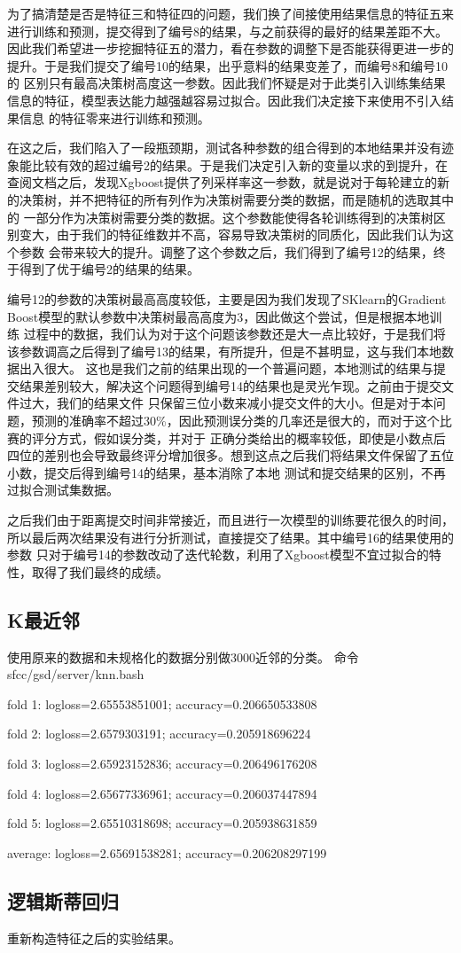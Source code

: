 为了搞清楚是否是特征三和特征四的问题，我们换了间接使用结果信息的特征五来进行训练和预测，提交得到了编号8的结果，与之前获得的最好的结果差距不大。
因此我们希望进一步挖掘特征五的潜力，看在参数的调整下是否能获得更进一步的提升。于是我们提交了编号10的结果，出乎意料的结果变差了，而编号8和编号10的
区别只有最高决策树高度这一参数。因此我们怀疑是对于此类引入训练集结果信息的特征，模型表达能力越强越容易过拟合。因此我们决定接下来使用不引入结果信息
的特征零来进行训练和预测。

在这之后，我们陷入了一段瓶颈期，测试各种参数的组合得到的本地结果并没有迹象能比较有效的超过编号2的结果。于是我们决定引入新的变量以求的到提升，在
查阅文档之后，发现Xgboost提供了列采样率这一参数，就是说对于每轮建立的新的决策树，并不把特征的所有列作为决策树需要分类的数据，而是随机的选取其中的
一部分作为决策树需要分类的数据。这个参数能使得各轮训练得到的决策树区别变大，由于我们的特征维数并不高，容易导致决策树的同质化，因此我们认为这个参数
会带来较大的提升。调整了这个参数之后，我们得到了编号12的结果，终于得到了优于编号2的结果的结果。

编号12的参数的决策树最高高度较低，主要是因为我们发现了SKlearn的Gradient Boost模型的默认参数中决策树最高高度为3，因此做这个尝试，但是根据本地训练
过程中的数据，我们认为对于这个问题该参数还是大一点比较好，于是我们将该参数调高之后得到了编号13的结果，有所提升，但是不甚明显，这与我们本地数据出入很大。
这也是我们之前的结果出现的一个普遍问题，本地测试的结果与提交结果差别较大，解决这个问题得到编号14的结果也是灵光乍现。之前由于提交文件过大，我们的结果文件
只保留三位小数来减小提交文件的大小。但是对于本问题，预测的准确率不超过30\%，因此预测误分类的几率还是很大的，而对于这个比赛的评分方式，假如误分类，并对于
正确分类给出的概率较低，即使是小数点后四位的差别也会导致最终评分增加很多。想到这点之后我们将结果文件保留了五位小数，提交后得到编号14的结果，基本消除了本地
测试和提交结果的区别，不再过拟合测试集数据。

之后我们由于距离提交时间非常接近，而且进行一次模型的训练要花很久的时间，所以最后两次结果没有进行分折测试，直接提交了结果。其中编号16的结果使用的参数
只对于编号14的参数改动了迭代轮数，利用了Xgboost模型不宜过拟合的特性，取得了我们最终的成绩。

\subsection{K最近邻}
    使用原来的数据和未规格化的数据分别做3000近邻的分类。
    命令 sfcc/gsd/server/knn.bash
	
	fold 1: logloss=2.65553851001; accuracy=0.206650533808

	fold 2: logloss=2.6579303191; accuracy=0.205918696224

	fold 3: logloss=2.65923152836; accuracy=0.206496176208

	fold 4: logloss=2.65677336961; accuracy=0.206037447894

	fold 5: logloss=2.65510318698; accuracy=0.205938631859

	average: logloss=2.65691538281; accuracy=0.206208297199

\subsection{逻辑斯蒂回归}
    重新构造特征之后的实验结果。